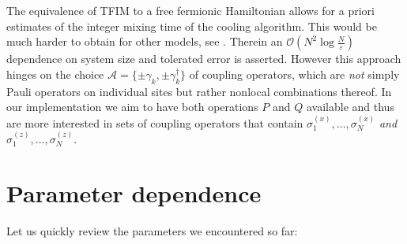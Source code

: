 \documentclass[12pt,a4paper]{article}
\let\varepsilon\varepsilon
\begin{document}
The equivalence of TFIM to a free fermionic Hamiltonian allows for a priori estimates of the integer mixing time of the cooling algorithm. This %
would be much harder to obtain %
for other models, see \citet[Appendix F.2]{ding2025}. Therein an $\mathcal{O}(N^2\log \tfrac{N}{\varepsilon})$ dependence on system size and tolerated error is asserted. However this approach hinges on the choice $\mathcal{A}=\{\pm \gamma_k, \pm \gamma_k^{\dagger}\}$ of coupling operators, which are \emph{not} simply Pauli operators on individual sites but rather nonlocal combinations thereof. In our implementation we aim to have both operations $P$ and $Q$ available and thus are more interested in sets of coupling operators that contain $\sigma^{(x)}_{1}, \dots, \sigma^{(x)}_{N}$ \emph{and} $\sigma^{(z)}_{1}, \dots, \sigma^{(z)}_{N}$.

\section{Parameter dependence}
Let us quickly review the parameters we encountered so far:
\end{document}
